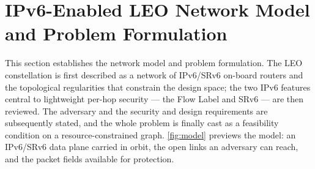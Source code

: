 \section{IPv6-Enabled LEO Network Model and Problem Formulation}
\label{sec:prelim}

This section establishes the network model and problem formulation. The LEO
constellation is first described as a network of IPv6/SRv6 on-board routers and
the topological regularities that constrain the design space; the
two IPv6 features central to lightweight per-hop security — the Flow Label and
SRv6 — are then reviewed. The adversary and the security and design requirements
are subsequently stated, and the whole problem is finally cast as a feasibility
condition on a resource-constrained graph. \cref{fig:model} previews the model: an IPv6/SRv6
data plane carried in orbit, the open links an adversary can reach, and the
packet fields available for protection.

